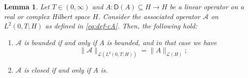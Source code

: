 \documentclass[10pt,a4paper]{amsart}
\newtheorem{lemma}{Lemma}
\newcommand{\from}{\colon}
\newcommand{\norm}[2]{     \| #1       \|_{ #2 }}
\begin{document}
\begin{lemma}\label{lem:Bochner-space-operator}
	Let $T\in(0,\infty)$ and 
	$A\from \mathsf D(A)\subseteq H\to H$ 
	be a linear operator on a real or complex 
	Hilbert space $H$.  
	Consider the associated operator 
	$\mathcal A$ on $L^2(0,T;H)$ 
	as defined in \eqref{eq:def-cA}.
	Then, the following hold: 
	\begin{enumerate}[leftmargin=1cm, label={\normalfont(\alph*)}]
		\item\label{lem:Bochner-space-operator-a} 
		$\mathcal A$ is bounded if and only if 
		$A$ is bounded, 
		and in that case we have 
		\[
		\norm{\mathcal A}{\mathscr L(L^2(0,T;H))} 
		= 
		\norm{A}{\mathscr L(H)} ;
		\]  
		\item\label{lem:Bochner-space-operator-b}
		$\mathcal A$ is closed if and only if $A$ is.
	\end{enumerate}
\end{lemma}
\end{document}

